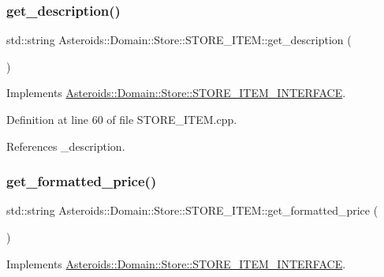 \subsubsection{\texorpdfstring{get\+\_\+description()}{get\_description()}}
{\footnotesize\ttfamily std\+::string Asteroids\+::\+Domain\+::\+Store\+::\+S\+T\+O\+R\+E\+\_\+\+I\+T\+E\+M\+::get\+\_\+description (\begin{DoxyParamCaption}{ }\end{DoxyParamCaption})\hspace{0.3cm}{\ttfamily [virtual]}}



Implements \hyperlink{classAsteroids_1_1Domain_1_1Store_1_1STORE__ITEM__INTERFACE_a75aeeea1b67c334516b4c385ab2d816d}{Asteroids\+::\+Domain\+::\+Store\+::\+S\+T\+O\+R\+E\+\_\+\+I\+T\+E\+M\+\_\+\+I\+N\+T\+E\+R\+F\+A\+CE}.



Definition at line 60 of file S\+T\+O\+R\+E\+\_\+\+I\+T\+E\+M.\+cpp.



References \+\_\+description.

\mbox{\label{classAsteroids_1_1Domain_1_1Store_1_1STORE__ITEM_aec607f6610f24f270da5dbfe7b866c05}} 
\subsubsection{\texorpdfstring{get\+\_\+formatted\+\_\+price()}{get\_formatted\_price()}}
{\footnotesize\ttfamily std\+::string Asteroids\+::\+Domain\+::\+Store\+::\+S\+T\+O\+R\+E\+\_\+\+I\+T\+E\+M\+::get\+\_\+formatted\+\_\+price (\begin{DoxyParamCaption}{ }\end{DoxyParamCaption})\hspace{0.3cm}{\ttfamily [virtual]}}



Implements \hyperlink{classAsteroids_1_1Domain_1_1Store_1_1STORE__ITEM__INTERFACE_acde01f5da09e656994cd6b76e1f5a625}{Asteroids\+::\+Domain\+::\+Store\+::\+S\+T\+O\+R\+E\+\_\+\+I\+T\+E\+M\+\_\+\+I\+N\+T\+E\+R\+F\+A\+CE}.



